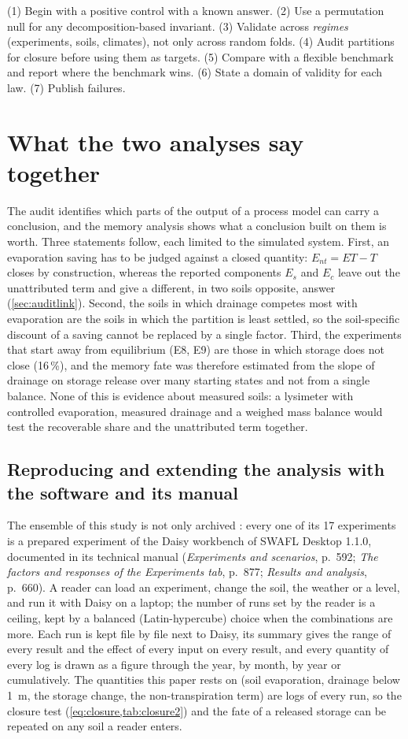 (1) Begin with a positive control with a known answer. (2) Use a permutation null for any decomposition-based invariant. (3) Validate across \emph{regimes} (experiments, soils, climates), not only across random folds. (4) Audit partitions for closure before using them as targets. (5) Compare with a flexible benchmark and report where the benchmark wins. (6) State a domain of validity for each law. (7) Publish failures.

\section{What the two analyses say together}
The audit identifies which parts of the output of a process model can carry a conclusion, and the memory analysis shows what a conclusion built on them is worth. Three statements follow, each limited to the simulated system. First, an evaporation saving has to be judged against a closed quantity: $E_{nt}=\mathit{ET}-T$ closes by construction, whereas the reported components $E_s$ and $E_c$ leave out the unattributed term and give a different, in two soils opposite, answer (\cref{sec:auditlink}). Second, the soils in which drainage competes most with evaporation are the soils in which the partition is least settled, so the soil-specific discount of a saving cannot be replaced by a single factor. Third, the experiments that start away from equilibrium (E8, E9) are those in which storage does not close (16\,\%), and the memory fate was therefore estimated from the slope of drainage on storage release over many starting states and not from a single balance. None of this is evidence about measured soils: a lysimeter with controlled evaporation, measured drainage and a weighed mass balance would test the recoverable share and the unattributed term together.

\subsection{Reproducing and extending the analysis with the software and its manual}\label{sec:swafl-repro}
The ensemble of this study is not only archived \citep{HaliluData}: every one of its 17 experiments is a prepared experiment of the Daisy workbench of SWAFL Desktop 1.1.0, documented in its technical manual \citep{HaliluManual} (\emph{Experiments and scenarios}, p.~592; \emph{The factors and responses of the Experiments tab}, p.~877; \emph{Results and analysis}, p.~660). A reader can load an experiment, change the soil, the weather or a level, and run it with Daisy on a laptop; the number of runs set by the reader is a ceiling, kept by a balanced (Latin-hypercube) choice when the combinations are more. Each run is kept file by file next to Daisy, its summary gives the range of every result and the effect of every input on every result, and every quantity of every log is drawn as a figure through the year, by month, by year or cumulatively. The quantities this paper rests on (soil evaporation, drainage below 1~m, the storage change, the non-transpiration term) are logs of every run, so the closure test (\cref{eq:closure,tab:closure2}) and the fate of a released storage can be repeated on any soil a reader enters.

